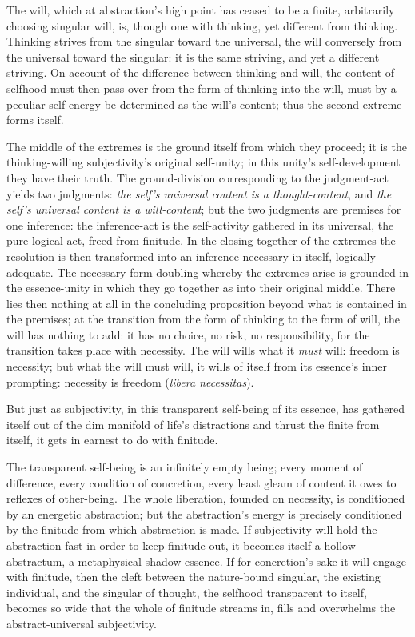 \documentclass[12pt]{book}
\begin{document}
The will, which at abstraction's high point has ceased to be a
finite, arbitrarily choosing singular will, is, though one with
thinking, yet different from thinking. Thinking strives from the
singular toward the universal, the will conversely from the
universal toward the singular: it is the same striving, and yet a
different striving. On account of the difference between thinking
and will, the content of selfhood must then pass over from the form
of thinking into the will, must by a peculiar self-energy be
determined as the will's content; thus the second extreme forms
itself.

The middle of the extremes is the ground itself from which they
proceed; it is the thinking-willing subjectivity's original
self-unity; in this unity's self-development they have their truth.
The ground-division corresponding to the judgment-act yields two
judgments: \emph{the self's universal content is a thought-content},
and \emph{the self's universal content is a will-content}; but the
two judgments are premises for one inference: the inference-act is
the self-activity gathered in its universal, the pure logical act,
freed from finitude.
In the closing-together of the extremes the resolution is then
transformed into an inference necessary in itself, logically
adequate. The necessary form-doubling whereby the extremes arise is
grounded in the essence-unity in which they go together as into
their original middle. There lies then nothing at all in the
concluding proposition beyond what is contained in the premises; at
the transition from the form of thinking to the form of will, the
will has nothing to add: it has no choice, no risk, no
responsibility, for the transition takes place with necessity. The
will wills what it \emph{must} will: freedom is necessity; but what
the will must will, it wills of itself from its essence's inner
prompting: necessity is freedom (\textit{libera necessitas}).

But just as subjectivity, in this transparent self-being of its
essence, has gathered itself out of the dim manifold of life's
distractions and thrust the finite from itself, it gets in earnest
to do with finitude.

The transparent self-being is an infinitely empty being; every
moment of difference, every condition of concretion, every least
gleam of content it owes to reflexes of other-being. The whole
liberation, founded on necessity, is conditioned by an energetic
abstraction; but the abstraction's energy is precisely conditioned
by the finitude from which abstraction is made. If subjectivity will
hold the abstraction fast in order to keep finitude out, it becomes
itself a hollow abstractum, a metaphysical shadow-essence. If for
concretion's sake it will engage with finitude, then the cleft
between the nature-bound singular, the existing individual, and the
singular of thought, the selfhood transparent to itself, becomes so
wide that the whole of finitude streams in, fills and overwhelms the
abstract-universal subjectivity.
\end{document}
